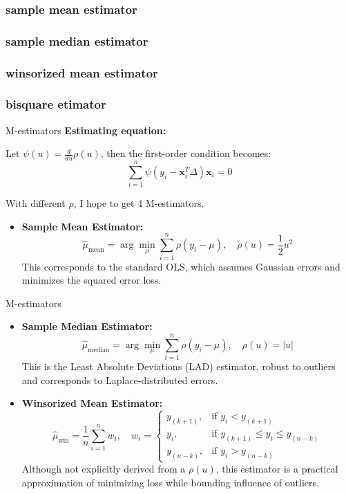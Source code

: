 \documentclass[aspectratio=169,xcolor=dvipsnames]{beamer}
\begin{document}
\subsubsection{sample mean estimator}
\subsubsection{sample median estimator}
\subsubsection{winsorized mean estimator}
\subsubsection{bisquare etimator}
\begin{frame}{M-estimators}
\textbf{Estimating equation:}

Let \( \psi(u) = \frac{d}{du} \rho(u) \), then the first-order condition becomes:
\[
\sum_{i=1}^{n} \psi\left( y_i - \mathbf{x}_i^T \Delta \right) \mathbf{x}_i = 0
\]

With different $\rho$, I hope to get 4 M-estimators.

\begin{itemize}
	\item \textbf{Sample Mean Estimator:}
	\[
	\hat{\mu}_{\text{mean}} = \arg\min_{\mu} \sum_{i=1}^{n} \rho(y_i - \mu), \quad \rho(u) = \frac{1}{2} u^2
	\]
	This corresponds to the standard OLS, which assumes Gaussian errors and minimizes the squared error loss.
\end{itemize}
\end{frame}

\begin{frame}{M-estimators}
	\begin{itemize}
	\item \textbf{Sample Median Estimator:}
	\[
	\hat{\mu}_{\text{median}} = \arg\min_{\mu} \sum_{i=1}^{n} \rho(y_i - \mu), \quad \rho(u) = |u|
	\]
	This is the Least Absolute Deviations (LAD) estimator, robust to outliers and corresponds to Laplace-distributed errors.
	
	\item \textbf{Winsorized Mean Estimator:}
	\[
	\hat{\mu}_{\text{win}} = \frac{1}{n} \sum_{i=1}^{n} w_i, \quad
	w_i =
	\begin{cases}
		y_{(k+1)}, & \text{if } y_i < y_{(k+1)} \\
		y_i,       & \text{if } y_{(k+1)} \leq y_i \leq y_{(n-k)} \\
		y_{(n-k)}, & \text{if } y_i > y_{(n-k)}
	\end{cases}
	\]
	Although not explicitly derived from a \(\rho(u)\), this estimator is a practical approximation of minimizing loss while bounding influence of outliers.
\end{itemize}
\end{frame}
\end{document}
